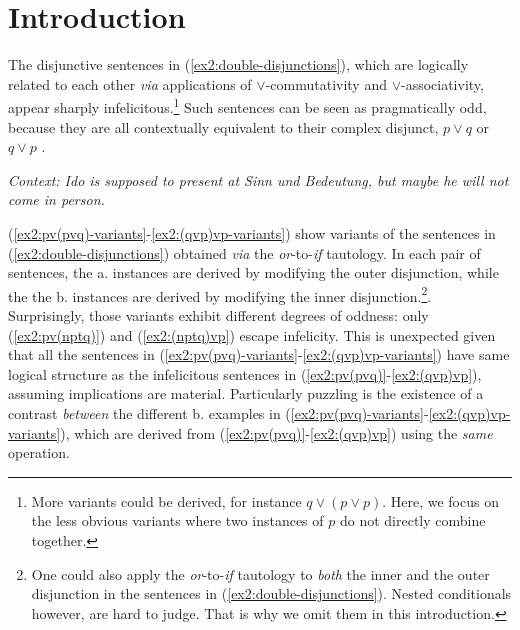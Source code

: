 \section{Introduction}
The disjunctive sentences in (\ref{ex2:double-disjunctions}), which are logically related to each other \textit{via} applications of $\vee$-commutativity and $\vee$-associativity, appear sharply infelicitous.\footnote{More variants could be derived, for instance $q\vee(p\vee p)$. Here, we focus on the less obvious variants where two instances of $p$ do not directly combine together.} Such sentences can be seen as pragmatically odd, because they are all contextually equivalent to their complex disjunct, $p\vee q$ or $q \vee p$
\citep{Katzir2014}.
\begin{exe}
	\ex \textit{Context: Ido is supposed to present at Sinn und Bedeutung, but maybe he will not come in person.}\label{ex2:double-disjunctions}
	\begin{xlist}
		\label{ex2:pv(pvq)}
		\label{ex2:pv(qvp)}
		\label{ex2:(pvq)vp}
		\label{ex2:(qvp)vp}
	\end{xlist}
	
\end{exe} 
(\ref{ex2:pv(pvq)-variants}-\ref{ex2:(qvp)vp-variants}) show variants of the sentences in (\ref{ex2:double-disjunctions}) obtained \textit{via} the \textit{or}-to-\textit{if} tautology. In each pair of sentences, the a. instances are derived by modifying the outer disjunction, while the the b. instances are derived by modifying the inner disjunction.\footnote{One could also apply the \textit{or}-to-\textit{if} tautology to \textit{both} the inner and the outer disjunction in the sentences in (\ref{ex2:double-disjunctions}). Nested conditionals however, are hard to judge. That is why we omit them in this introduction.}. Surprisingly, those variants exhibit different degrees of oddness: only (\ref{ex2:pv(nptq)}) and (\ref{ex2:(nptq)vp}) escape infelicity. This is unexpected given that all the sentences in (\ref{ex2:pv(pvq)-variants}-\ref{ex2:(qvp)vp-variants}) have same logical structure as the infelicitous sentences in (\ref{ex2:pv(pvq)}-\ref{ex2:(qvp)vp}), assuming implications are material. Particularly puzzling is the existence of a contrast \textit{between} the different b. examples in (\ref{ex2:pv(pvq)-variants}-\ref{ex2:(qvp)vp-variants}), which are derived from (\ref{ex2:pv(pvq)}-\ref{ex2:(qvp)vp}) using the \textit{same} operation.
